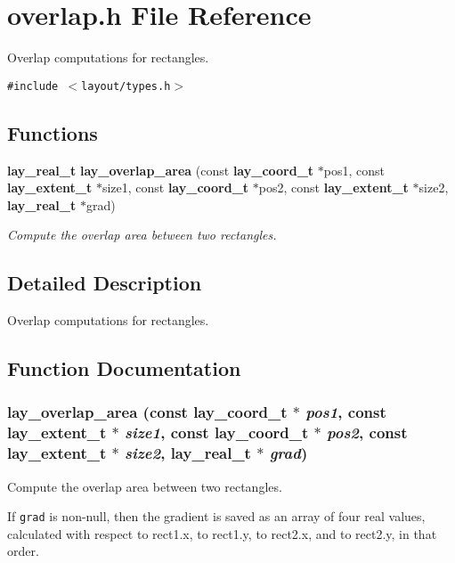 \section{overlap.h File Reference}
\label{overlap_8h}
Overlap computations for rectangles.  


{\tt \#include $<$layout/types.h$>$}\par
\subsection*{Functions}
\begin{CompactItemize}
\item 
{\bf lay\_\-real\_\-t} {\bf lay\_\-overlap\_\-area} (const  {\bf lay\_\-coord\_\-t} $\ast$pos1, const  {\bf lay\_\-extent\_\-t} $\ast$size1, const  {\bf lay\_\-coord\_\-t} $\ast$pos2, const  {\bf lay\_\-extent\_\-t} $\ast$size2, {\bf lay\_\-real\_\-t} $\ast$grad)
\begin{CompactList}\small\item\em Compute the overlap area between two rectangles. \item\end{CompactList}\end{CompactItemize}


\subsection{Detailed Description}
Overlap computations for rectangles. 



\subsection{Function Documentation}
\subsubsection{ lay\_\-overlap\_\-area (const {\bf lay\_\-coord\_\-t} $\ast$ {\em pos1}, const {\bf lay\_\-extent\_\-t} $\ast$ {\em size1}, const {\bf lay\_\-coord\_\-t} $\ast$ {\em pos2}, const {\bf lay\_\-extent\_\-t} $\ast$ {\em size2}, {\bf lay\_\-real\_\-t} $\ast$ {\em grad})}\label{overlap_8h_a0}


Compute the overlap area between two rectangles. 

If {\tt grad} is non-null, then the gradient is saved as an array of four real values, calculated with respect to rect1.x, to rect1.y, to rect2.x, and to rect2.y, in that order. 